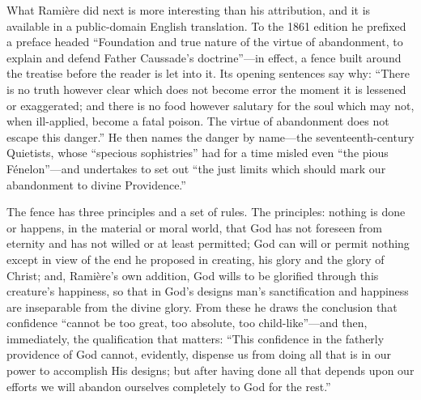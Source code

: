 What Ramière did next is more interesting than his attribution, and it is available in a public-domain English translation. To the 1861 edition he prefixed a preface headed ``Foundation and true nature of the virtue of abandonment, to explain and defend Father Caussade's doctrine''---in effect, a fence built around the treatise before the reader is let into it. Its opening sentences say why: ``There is no truth however clear which does not become error the moment it is lessened or exaggerated; and there is no food however salutary for the soul which may not, when ill-applied, become a fatal poison. The virtue of abandonment does not escape this danger.'' He then names the danger by name---the seventeenth-century Quietists, whose ``specious sophistries'' had for a time misled even ``the pious Fénelon''---and undertakes to set out ``the just limits which should mark our abandonment to divine Providence.''

The fence has three principles and a set of rules. The principles: nothing is done or happens, in the material or moral world, that God has not foreseen from eternity and has not willed or at least permitted; God can will or permit nothing except in view of the end he proposed in creating, his glory and the glory of Christ; and, Ramière's own addition, God wills to be glorified through this creature's happiness, so that in God's designs man's sanctification and happiness are inseparable from the divine glory. From these he draws the conclusion that confidence ``cannot be too great, too absolute, too child-like''---and then, immediately, the qualification that matters: ``This confidence in the fatherly providence of God cannot, evidently, dispense us from doing all that is in our power to accomplish His designs; but after having done all that depends upon our efforts we will abandon ourselves completely to God for the rest.''

